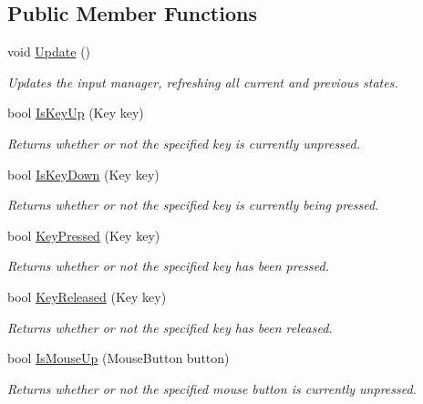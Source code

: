 \subsection*{Public Member Functions}
\begin{DoxyCompactItemize}
\item 
void \hyperlink{class_tri_devs_1_1_tri_engine_1_1_input_1_1_null_input_manager_a157adf4ca06c372b4ec0f759b0d1ad4f}{Update} ()
\begin{DoxyCompactList}\small\item\em Updates the input manager, refreshing all current and previous states. \end{DoxyCompactList}\item 
bool \hyperlink{class_tri_devs_1_1_tri_engine_1_1_input_1_1_null_input_manager_a2e3c545918496918807ab2f283766108}{Is\-Key\-Up} (Key key)
\begin{DoxyCompactList}\small\item\em Returns whether or not the specified key is currently unpressed. \end{DoxyCompactList}\item 
bool \hyperlink{class_tri_devs_1_1_tri_engine_1_1_input_1_1_null_input_manager_ae5cac155bc2866b6760ae2924d35eebd}{Is\-Key\-Down} (Key key)
\begin{DoxyCompactList}\small\item\em Returns whether or not the specified key is currently being pressed. \end{DoxyCompactList}\item 
bool \hyperlink{class_tri_devs_1_1_tri_engine_1_1_input_1_1_null_input_manager_a5fd3573dd98d4bcf259906486b6d9050}{Key\-Pressed} (Key key)
\begin{DoxyCompactList}\small\item\em Returns whether or not the specified key has been pressed. \end{DoxyCompactList}\item 
bool \hyperlink{class_tri_devs_1_1_tri_engine_1_1_input_1_1_null_input_manager_a6a2213bad293518b3ecd69d89324a462}{Key\-Released} (Key key)
\begin{DoxyCompactList}\small\item\em Returns whether or not the specified key has been released. \end{DoxyCompactList}\item 
bool \hyperlink{class_tri_devs_1_1_tri_engine_1_1_input_1_1_null_input_manager_a7299ed975cd07a420b9d5d82f93fce31}{Is\-Mouse\-Up} (Mouse\-Button button)
\begin{DoxyCompactList}\small\item\em Returns whether or not the specified mouse button is currently unpressed. \end{DoxyCompactList}\item 

\end{DoxyCompactItemize}
